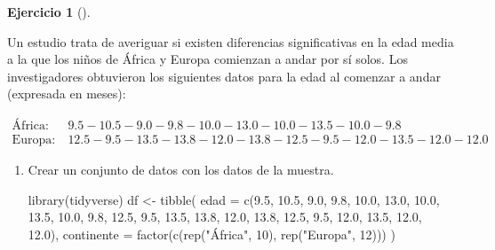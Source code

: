 \documentclass[
  a4paper,
]{scrreport}
\newenvironment{Shaded}{\begin{snugshade}}{\end{snugshade}}
\newcommand{\AttributeTok}[1]{\textcolor[rgb]{0.40,0.45,0.13}{#1}}
\newcommand{\DecValTok}[1]{\textcolor[rgb]{0.68,0.00,0.00}{#1}}
\newcommand{\FloatTok}[1]{\textcolor[rgb]{0.68,0.00,0.00}{#1}}
\newcommand{\FunctionTok}[1]{\textcolor[rgb]{0.28,0.35,0.67}{#1}}
\newcommand{\NormalTok}[1]{\textcolor[rgb]{0.00,0.23,0.31}{#1}}
\newcommand{\OtherTok}[1]{\textcolor[rgb]{0.00,0.23,0.31}{#1}}
\newcommand{\StringTok}[1]{\textcolor[rgb]{0.13,0.47,0.30}{#1}}
\theoremstyle{definition}
\newtheorem{exercise}{Ejercicio}[chapter]
\theoremstyle{remark}
\begin{document}
\begin{exercise}[]\protect\hypertarget{exr-contraste-hipotesis-media-edad-andar}{}\label{exr-contraste-hipotesis-media-edad-andar}

Un estudio trata de averiguar si existen diferencias significativas en
la edad media a la que los niños de África y Europa comienzan a andar
por sí solos. Los investigadores obtuvieron los siguientes datos para la
edad al comenzar a andar (expresada en meses):

\begin{align*}
\textrm{África}:& \ 9.5-10.5-9.0-9.8-10.0-13.0-10.0-13.5-10.0-9.8\\
\textrm{Europa}:& \ 12.5-9.5-13.5-13.8-12.0-13.8-12.5-9.5-12.0-13.5-12.0-12.0
\end{align*}

\begin{enumerate}
\def\labelenumi{\alph{enumi}.}
\item
  Crear un conjunto de datos con los datos de la muestra.

  \begin{tcolorbox}[enhanced jigsaw, colframe=quarto-callout-tip-color-frame, toprule=.15mm, bottomtitle=1mm, breakable, opacitybacktitle=0.6, toptitle=1mm, colback=white, bottomrule=.15mm, title=\textcolor{quarto-callout-tip-color}{\faLightbulb}\hspace{0.5em}{Solución}, arc=.35mm, left=2mm, titlerule=0mm, rightrule=.15mm, coltitle=black, leftrule=.75mm, opacityback=0, colbacktitle=quarto-callout-tip-color!10!white]

\begin{Shaded}
\begin{Highlighting}[]
\FunctionTok{library}\NormalTok{(tidyverse)}
\NormalTok{df }\OtherTok{\textless{}{-}} \FunctionTok{tibble}\NormalTok{(}
    \AttributeTok{edad =} \FunctionTok{c}\NormalTok{(}\FloatTok{9.5}\NormalTok{, }\FloatTok{10.5}\NormalTok{, }\FloatTok{9.0}\NormalTok{, }\FloatTok{9.8}\NormalTok{, }\FloatTok{10.0}\NormalTok{, }\FloatTok{13.0}\NormalTok{, }\FloatTok{10.0}\NormalTok{, }\FloatTok{13.5}\NormalTok{, }\FloatTok{10.0}\NormalTok{, }\FloatTok{9.8}\NormalTok{, }\FloatTok{12.5}\NormalTok{, }\FloatTok{9.5}\NormalTok{, }\FloatTok{13.5}\NormalTok{, }\FloatTok{13.8}\NormalTok{, }\FloatTok{12.0}\NormalTok{, }\FloatTok{13.8}\NormalTok{, }\FloatTok{12.5}\NormalTok{, }\FloatTok{9.5}\NormalTok{, }\FloatTok{12.0}\NormalTok{, }\FloatTok{13.5}\NormalTok{, }\FloatTok{12.0}\NormalTok{, }\FloatTok{12.0}\NormalTok{),}
    \AttributeTok{continente =} \FunctionTok{factor}\NormalTok{(}\FunctionTok{c}\NormalTok{(}\FunctionTok{rep}\NormalTok{(}\StringTok{"África"}\NormalTok{, }\DecValTok{10}\NormalTok{), }\FunctionTok{rep}\NormalTok{(}\StringTok{"Europa"}\NormalTok{, }\DecValTok{12}\NormalTok{)))}
\NormalTok{)}
\end{Highlighting}
\end{Shaded}


\end{tcolorbox}
\end{enumerate}
\end{exercise}
\end{document}
